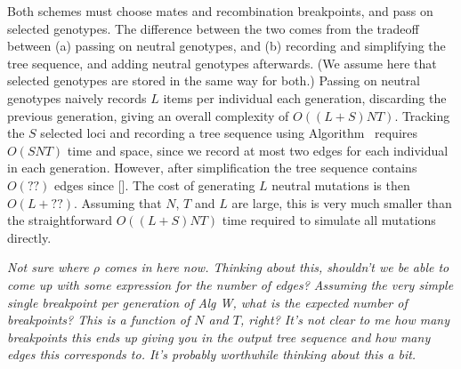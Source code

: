 \documentclass{article}
\newcommand{\jk}[1]{{\em \color{red} #1}}
\begin{document}
Both schemes must choose mates and recombination breakpoints,
and pass on selected genotypes.
The difference between the two comes from the tradeoff between
(a) passing on neutral genotypes, and
(b) recording and simplifying the tree sequence, and adding neutral genotypes afterwards.
(We assume here that selected genotypes are stored in the same way for both.)
Passing on neutral genotypes naively records $L$ items per individual each
generation, discarding the previous generation, giving an overall complexity of
$O((L + S) NT)$. Tracking the $S$ selected loci and recording a tree sequence
using Algorithm~ requires $O(SNT)$ time and space, since we
record at most two edges for each individual in each generation.
However, after simplification the tree sequence contains
$O(??)$ edges since []. The cost of generating $L$ neutral mutations
is then $O(L + ??)$. Assuming that $N$, $T$ and $L$ are large, this is
very much smaller than the straightforward $O((L + S) NT)$ time required
to simulate all mutations directly.

\jk{Not sure where $\rho$ comes in here now. Thinking about this, shouldn't we
be able to come up with some expression for the number of edges? Assuming
the very simple single breakpoint per generation of Alg W, what is the
expected number of breakpoints? This is a function of $N$ and $T$, right?
It's not clear to me how many breakpoints this ends up giving you in
the output tree sequence and how many edges this corresponds to.
It's probably worthwhile thinking about this a bit.}



\end{document}
